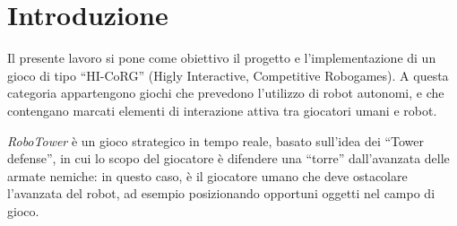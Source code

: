 \chapter{Introduzione}
\label{cap:introduzione}

Il presente lavoro si pone come obiettivo il progetto e l'implementazione di un gioco di tipo ``HI-CoRG'' (Higly Interactive, Competitive Robogames). A questa categoria appartengono giochi che prevedono l'utilizzo di robot autonomi, e che contengano marcati elementi di interazione attiva tra giocatori umani e robot.

\emph{RoboTower} è un gioco strategico in tempo reale, basato sull'idea dei ``Tower defense'', in cui lo scopo del giocatore è difendere una ``torre'' dall'avanzata delle armate nemiche: in questo caso, è il giocatore umano che deve ostacolare l'avanzata del robot, ad esempio posizionando opportuni oggetti nel campo di gioco.